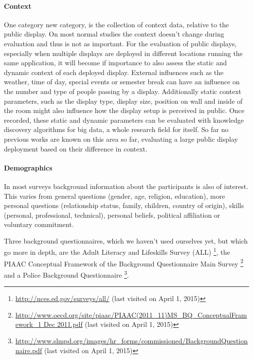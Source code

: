 	\paragraph{Context}

		One category new category, is the collection of context data, relative to the public display. On most normal studies the context doesn't change during evaluation and thus is not as important. For the evaluation of public displays, especially when multiple displays are deployed in different locations running the same application, it will become if importance to also assess the static and dynamic context of each deployed display. External influences such as the weather, time of day, special events or semester break can have an influence on the number and type of people passing by a display. Additionally static context parameters, such as the display type, display size, position on wall and inside of the room might also influence how the display setup is perceived in public. Once recorded, these static and dynamic parameters can be evaluated with knowledge discovery algorithms for big data, a whole research field for itself. 
		So far no previous works are known on this area so far, evaluating a large public display deployment based on their difference in context.

	\paragraph{Demographics}

		In most surveys background information about the participants is also of interest. This varies from general questions (gender, age, religion, education), more personal questions (relationship status, family, children, country of origin), skills (personal, professional, technical), personal beliefs, political affiliation or voluntary commitment.

		Three background questionnaires, which we haven't used ourselves yet, but which go more in depth, are the Adult Literacy and Lifeskills Survey (ALL) \footnote{\url{http://nces.ed.gov/surveys/all/} (last visited on April 1, 2015)}, the PIAAC Conceptual Framework of the Background Questionnaire Main Survey \footnote{\url{http://www.oecd.org/site/piaac/PIAAC(2011_11)MS_BQ_ConceptualFramework_1 Dec 2011.pdf} (last visited on April 1, 2015)} and a Police Background Questionnaire \footnote{\url{http://www.slmpd.org/images/hr_forms/commissioned/BackgroundQuestionnaire.pdf} (last visited on April 1, 2015)}.



